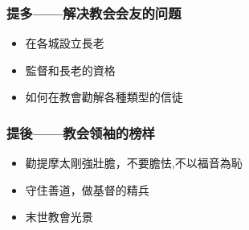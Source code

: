 \subsubsection{提多——解决教会会友的问题}
\begin{itemize}%
\itemsep-.25em 
\item 在各城設立長老 
\item 監督和長老的資格
\item 如何在教會勸解各種類型的信徒
\end{itemize}

\subsubsection{提後——教会领袖的榜样}
\begin{itemize}%
\itemsep-.25em 
\item 勸提摩太剛強壯膽，不要膽怯,不以福音為恥
\item 守住善道，做基督的精兵 
\item 末世教會光景
\end{itemize}


